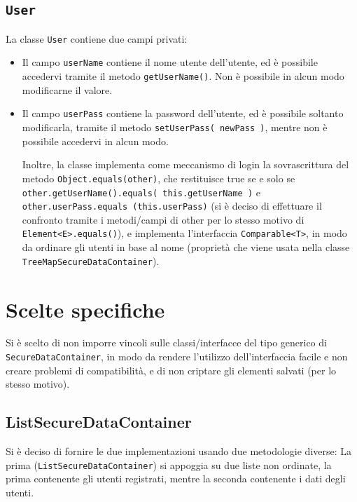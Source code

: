 \documentclass{article}
\begin{document}
\subsection{\texttt{User}}
La classe \texttt{User} contiene due campi privati:
\begin{itemize}
\item Il campo \texttt{userName} contiene il nome utente dell'utente, ed è possibile accedervi tramite il metodo \texttt{getUserName()}. Non è possibile in alcun modo modificarne il valore.

\item Il campo \texttt{userPass} contiene la password dell'utente, ed è possibile soltanto modificarla,  tramite il metodo \texttt{setUserPass( newPass )}, mentre non è possibile accedervi in alcun modo.

Inoltre, la classe implementa come meccanismo di login la sovrascrittura del metodo \texttt{Object.equals(other)}, che restituisce true se e solo se \texttt{other.getUserName().equals( this.getUserName )} e \newline
\texttt{other.userPass.equals (this.userPass)} (si è deciso di effettuare il confronto tramite i metodi/campi di other per lo stesso motivo di   \newline\texttt{Element<E>.equals()}), e implementa l'interfaccia \texttt{Comparable<T>}, in modo da ordinare gli utenti in base al nome (proprietà che viene usata nella classe \texttt{TreeMapSecureDataContainer}).
\end{itemize}

\section{Scelte specifiche}
Si è scelto di non imporre vincoli sulle classi/interfacce del tipo generico di \texttt{SecureDataContainer}, in modo da rendere l'utilizzo dell'interfaccia facile e non creare problemi di compatibilità, e di non criptare gli elementi salvati (per lo stesso motivo).
\subsection{ListSecureDataContainer}
Si è deciso di fornire le due implementazioni usando due metodologie diverse:
La prima (\texttt{ListSecureDataContainer}) si appoggia su due liste non ordinate, la prima contenente gli utenti registrati, mentre la seconda contenente i dati degli utenti.
\end{document}
